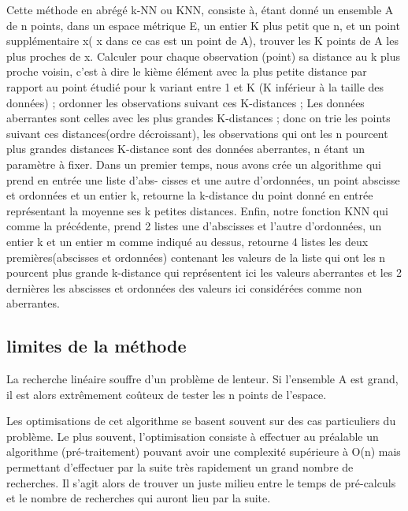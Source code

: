 \documentclass[a4paper,12pt]{article} %
\begin{document}
    					
                        Cette méthode en abrégé k-NN ou KNN, consiste à, étant donné un ensemble A de n points, dans un espace métrique E, un entier K plus petit que n, et un point supplémentaire x( x dans ce cas est un point de A), trouver les K points de A les plus proches de x.
                        \newline
                        Calculer pour chaque observation (point) sa distance au k plus proche voisin, c'est à dire le kième élément avec la plus petite distance par rapport au point étudié pour k variant entre 1 et K (K inférieur à la taille des données) ; ordonner les observations suivant ces K-distances ; Les données aberrantes sont celles avec les plus grandes K-distances ; donc on trie les points suivant ces distances(ordre décroissant), les observations qui ont les n pourcent plus grandes distances K-distance sont des données aberrantes, n étant un paramètre à fixer.
                        \newline
                        \newline
                        Dans un premier temps, nous avons crée un algorithme qui prend en entrée une liste d’abs-
                        cisses et une autre d’ordonnées, un point abscisse et ordonnées et un entier k, retourne la
                        k-distance du point donné en entrée représentant la moyenne ses k petites distances.
                        \newline
                        Enfin, notre fonction KNN qui comme la précédente, prend 2 listes une d’abscisses et l’autre
                        d’ordonnées, un entier k et un entier m comme indiqué au dessus, retourne 4 listes les deux
                        premières(abscisses et ordonnées) contenant les valeurs de la liste qui ont les n pourcent plus
                        grande k-distance qui représentent ici les valeurs aberrantes et les 2 dernières les abscisses et
                        ordonnées des valeurs ici considérées comme non aberrantes.
                        
                        \subsection{limites de la méthode}
                        La recherche linéaire souffre d'un problème de lenteur. Si l'ensemble A est grand, il est alors extrêmement coûteux de tester les n points de l'espace.
                        
                        Les optimisations de cet algorithme se basent souvent sur des cas particuliers du problème. Le plus souvent, l'optimisation consiste à effectuer au préalable un algorithme (pré-traitement) pouvant avoir une complexité supérieure à O(n) mais permettant d'effectuer par la suite très rapidement un grand nombre de recherches. Il s'agit alors de trouver un juste milieu entre le temps de pré-calculs et le nombre de recherches qui auront lieu par la suite. 
                        
\end{document}
